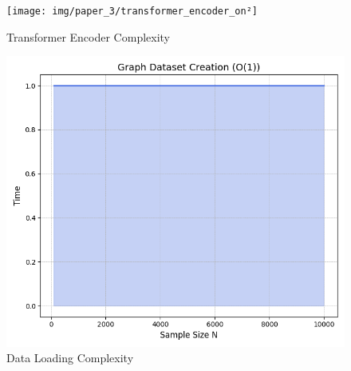 \begin{figure}[htbp]
	\centering
	\begin{minipage}[b]{0.45\linewidth}
		\texttt{[image: img/paper\_3/transformer\_encoder\_on²]}
		\caption{Transformer Encoder Complexity}
		\label{fig:transformerencoderon2}
	\end{minipage}
	\hfill
	\begin{minipage}[b]{0.45\linewidth}
		\includegraphics[width=\linewidth]{img/paper_3/data_loading_complexity_with_legend_updated}
		\caption{Data Loading Complexity}
		\label{fig:dataloadingcomplexitywithlegendupdated}
	\end{minipage}
\end{figure}

